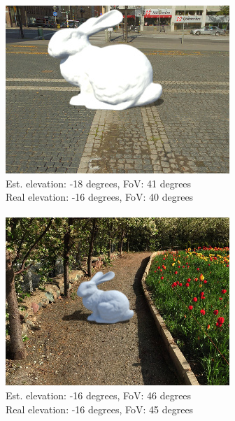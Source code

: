 \begin{multicols}{2}

\includegraphics[width=\mywidth]{pano_aizkyyutyizoaz.jpg}\\
\small Est. elevation: -18 degrees, FoV: 41 degrees\\
\small Real elevation: -16 degrees, FoV: 40 degrees\\
~\\
\includegraphics[width=\mywidth]{pano_ajlwcdjsjcaemh_002.jpg}\\
\small Est. elevation: -16 degrees, FoV: 46 degrees\\
\small Real elevation: -16 degrees, FoV: 45 degrees\\


\end{multicols}
